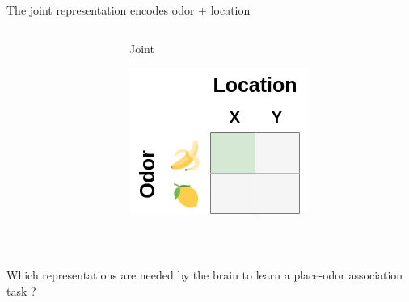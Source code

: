 \documentclass[bigger]{beamer}
\begin{document}
\begin{frame}[label={sec:org269dcca}]{The joint representation encodes odor + location}
\begin{columns}
\begin{column}{0.33\columnwidth}
\begin{center}
\end{center}
\end{column}
\begin{column}{0.33\columnwidth}
\begin{center}
Joint
\end{center}
\begin{center}
\includegraphics[width=.9\linewidth]{img/joint-repr-joint.drawio.png}
\end{center}
\end{column}
\end{columns}
\end{frame}
\begin{frame}[label={sec:org8b06670},standout]{~}
\raggedright
Which representations are needed by the brain to learn a place-odor association task ?
\end{frame}
\end{document}
